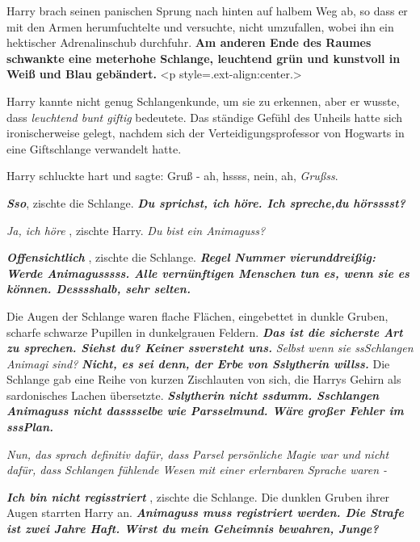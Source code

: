 Harry brach seinen panischen Sprung nach hinten auf halbem Weg ab, so dass er
mit den Armen herumfuchtelte und versuchte, nicht umzufallen, wobei ihn ein
hektischer Adrenalinschub durchfuhr.
\textbf{ Am anderen Ende des Raumes schwankte eine meterhohe Schlange, leuchtend
grün und kunstvoll in Weiß und Blau gebändert.}  <p
style=\grqq{}.ext-align:center\grqq{}.>

Harry kannte nicht genug Schlangenkunde, um sie zu erkennen, aber er wusste,
dass \emph{ \glqq{}leuchtend bunt\grqq{} \glqq{}giftig\grqq{}} bedeutete. Das
ständige Gefühl des Unheils hatte sich ironischerweise gelegt, nachdem sich der
Verteidigungsprofessor von Hogwarts in eine Giftschlange verwandelt hatte.

Harry schluckte hart und sagte: \glqq{}Gruß - ah, hssss, nein, ah,
\emph{Grußss}.\grqq{}

\glqq{}\textbf{\emph{Sso}}\grqq{}, zischte die Schlange. \textbf{\emph{\glqq{}Du
sprichst, ich höre. Ich spreche,du hörsssst?\grqq{}} }

\emph{\glqq{}Ja, ich höre\grqq{}} , zischte Harry. \emph{\glqq{}Du bist ein
Animaguss?\grqq{}}

\textbf{\emph{ \glqq{}Offensichtlich\grqq{}} }, zischte die Schlange.
\textbf{\emph{ \glqq{}Regel Nummer vierunddreißig: Werde Animagusssss. Alle
vernünftigen Menschen tun es, wenn sie es können. Desssshalb, sehr
selten.\grqq{}} }

Die Augen der Schlange waren flache Flächen, eingebettet in dunkle Gruben,
scharfe schwarze Pupillen in dunkelgrauen Feldern. \textbf{\emph{ \glqq{}Das ist
die sicherste Art zu sprechen. Siehst du? Keiner ssversteht uns.\grqq{}} }
\emph{\glqq{}Selbst wenn sie ssSchlangen Animagi sind?\grqq{}} \textbf{\emph{ \glqq{}
Nicht, es sei denn, der Erbe von Sslytherin willss.\grqq{}} } Die Schlange gab
eine Reihe von kurzen Zischlauten von sich, die Harrys Gehirn als sardonisches
Lachen übersetzte. \textbf{\emph{ \glqq{}Sslytherin nicht ssdumm. Sschlangen
Animaguss nicht dasssselbe wie Parsselmund. Wäre großer Fehler im
sssPlan.\grqq{}} }

\emph{Nun, das sprach definitiv dafür, dass Parsel persönliche Magie war und
nicht dafür, dass Schlangen fühlende Wesen mit einer erlernbaren Sprache
waren -}

\textbf{\emph{ \glqq{}Ich bin nicht regisstriert\grqq{}} }, zischte die Schlange.
Die dunklen Gruben ihrer Augen starrten Harry an. \textbf{\emph{ \glqq{}Animaguss
muss registriert werden. Die Strafe ist zwei Jahre Haft. Wirst du mein Geheimnis
bewahren, Junge?}}\grqq{}

